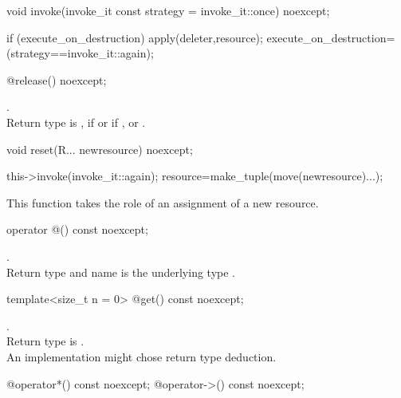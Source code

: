 \documentclass[ebook,11pt,article]{memoir}
\begin{document}
\begin{itemdecl}
	void invoke(invoke_it const strategy = invoke_it::once) noexcept;
\end{itemdecl}

\pnum
\effects 
\begin{codeblock}
if (execute_on_destruction) 
    apply(deleter,resource); 
execute_on_destruction=(strategy==invoke_it::again);
\end{codeblock}

\begin{itemdecl}
	@\seebelow@ release() noexcept;
\end{itemdecl}

\pnum
\effects {}

\pnum
\returns {}. 
\\Return type is , if  or  if , or .

\begin{itemdecl}
	void reset(R... newresource) noexcept;
\end{itemdecl}

\pnum
\effects 
\begin{codeblock}
this->invoke(invoke_it::again); 
resource=make_tuple(move(newresource)...);
\end{codeblock}

\pnum
\enternote This function takes the role of an assignment of a new resource.
\exitnote

\begin{itemdecl}
	operator  @\seebelow@() const noexcept;
\end{itemdecl}

\pnum
\returns {}.
\\Return type and  name is the underlying type . 

\begin{itemdecl}
	template<size_t n = 0>
	@\seebelow@  get() const noexcept;
\end{itemdecl}

\pnum
\returns {}.
\\Return type is . 
\\\enternote An implementation might chose  return type deduction.
\exitnote

\begin{itemdecl}
	@\seebelow@  operator*() const noexcept;
	@\seebelow@  operator->() const noexcept;
\end{itemdecl}
\end{document}
